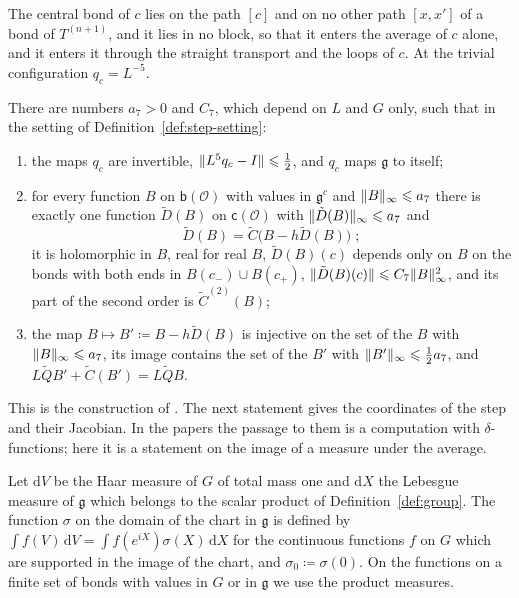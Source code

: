 \documentclass[11pt]{preprint}
\newcommand{\dd}{\mathrm{d}}
\DeclarePairedDelimiter{\norm}{\lVert}{\rVert}
\numberwithin{equation}{section}
\begin{document}
The central bond of $c$ lies on the path $[c]$ and on no other path $[x, x']$ of a bond of $T^{(n+1)}$, and it lies in no block, so that it enters the average of $c$ alone, and it enters it through the straight transport and the loops of $c$. At the trivial configuration $q_c = L^{-5}$.

\begin{proposition}\label{prop:unit-linearising}
There are numbers $a_7 > 0$ and $C_7$, which depend on $L$ and $G$ only, such that in the setting of Definition~\ref{def:step-setting}:
\begin{enumerate}[label=(\roman*)]
\item the maps $q_c$ are invertible, $\norm{L^5q_c - I} \leqslant \frac{1}{2}$, and $q_c$ maps $\mathfrak g$ to itself;
\item for every function $B$ on $\mathsf b(\mathcal O)$ with values in $\mathfrak g^c$ and $\norm B_\infty \leqslant a_7$ there is exactly one function $\tilde D(B)$ on $\mathsf c(\mathcal O)$ with $\norm{\tilde D(B)}_\infty \leqslant a_7$ and
\begin{equation}\label{eq:unit-linearising}
    \tilde D(B) = \tilde C\bigl(B - h\tilde D(B)\bigr)\;;
\end{equation}
it is holomorphic in $B$, real for real $B$, $\tilde D(B)(c)$ depends only on $B$ on the bonds with both ends in $B(c_-) \cup B(c_+)$, $\norm{\tilde D(B)(c)} \leqslant C_7\norm B_\infty^2$, and its part of the second order is $\tilde C^{(2)}(B)$;
\item the map $B \mapsto B' \coloneqq B - h\tilde D(B)$ is injective on the set of the $B$ with $\norm B_\infty \leqslant a_7$, its image contains the set of the $B'$ with $\norm{B'}_\infty \leqslant \frac{1}{2}a_7$, and $L\tilde QB' + \tilde C(B') = L\tilde QB$.
\end{enumerate}
\end{proposition}

This is the construction of \cite[p.~267]{BalabanRG1}. The next statement gives the coordinates of the step and their Jacobian. In the papers the passage to them is a computation with $\delta$-functions; here it is a statement on the image of a measure under the average.

\begin{definition}\label{def:haar-density}
Let $\dd V$ be the Haar measure of $G$ of total mass one and $\dd X$ the Lebesgue measure of $\mathfrak g$ which belongs to the scalar product of Definition~\ref{def:group}. The function $\sigma$ on the domain of the chart in $\mathfrak g$ is defined by $\int f(V)\,\dd V = \int f(e^{iX})\sigma(X)\,\dd X$ for the continuous functions $f$ on $G$ which are supported in the image of the chart, and $\sigma_0 \coloneqq \sigma(0)$. On the functions on a finite set of bonds with values in $G$ or in $\mathfrak g$ we use the product measures.
\end{definition}
\end{document}
